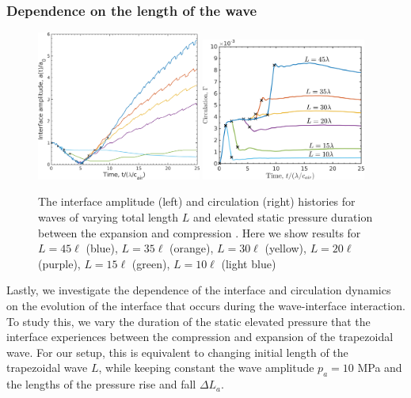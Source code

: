 \subsubsection{Dependence on the length of the wave}%
\begin{figure}[h]
  \centering
  \includegraphics[width=0.48\textwidth]{./figs/lung_figs/interface_multi-lag}
  \includegraphics[width=0.48\textwidth]{./figs/lung_figs/circulation_multi-lag_fixed}
  \caption[The interface and circulation dependence on wave
  duration]{The interface amplitude (left) and circulation (right)
    histories for waves of varying total length $L$ and elevated
    static pressure duration between the expansion and compression
    . Here we show results for $L=45\ell$ (blue), $L=35\ell$
    (orange), $L=30\ell$ (yellow), $L=20\ell$ (purple),
    $L=15\ell$ (green), $L=10\ell$ (light blue)}
  \label{fig:trapz_circ_interface_multi-lag}
\end{figure}
Lastly, we investigate the dependence of the interface and circulation
dynamics on the evolution of the interface that occurs during the
wave-interface interaction. To study this, we vary the duration of the
static elevated pressure that the interface experiences between the
compression and expansion of the trapezoidal wave. For our setup, this
is equivalent to changing initial length of the trapezoidal wave $L$,
while keeping constant the wave amplitude $p_a=10$ MPa and the lengths
of the pressure rise and fall $\Delta L_a$. 

